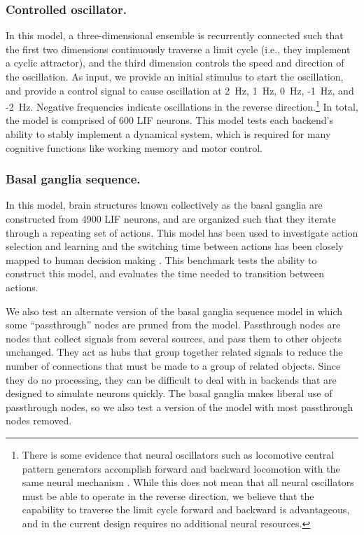 \documentclass{frontiersSCNS}
\begin{document}
\subsubsection{Controlled oscillator.}

In this model,
a three-dimensional ensemble is recurrently connected
such that the first two dimensions continuously
traverse a limit cycle
(i.e., they implement a cyclic attractor),
and the third dimension controls the speed
and direction of the oscillation.
As input, we provide an initial stimulus
to start the oscillation,
and provide a control signal
to cause oscillation at
2~Hz, 1~Hz, 0~Hz, -1~Hz, and -2~Hz.
Negative frequencies indicate oscillations
in the reverse direction.\footnote{There is some evidence
  that neural oscillators such as locomotive central pattern generators
  accomplish forward and backward locomotion
  with the same neural mechanism \citep{duysens1998}.
  While this does not mean that all neural oscillators must
  be able to operate in the reverse direction,
  we believe that the capability to traverse
  the limit cycle forward and backward is advantageous,
  and in the current design requires no additional neural resources.}
In total, the model is comprised of 600 LIF neurons.
This model tests each backend's ability
to stably implement a dynamical system,
which is required for many cognitive functions
like working memory and motor control.

\subsubsection{Basal ganglia sequence.}

In this model, brain structures
known collectively as the basal ganglia
are constructed from 4900 LIF neurons,
and are organized such that they iterate
through a repeating set of actions.
This model has been used to investigate
action selection and learning \citep{stewart2012a}
and the switching time between actions
has been closely mapped to human decision making
\citep{stewart2010}.
This benchmark tests the ability
to construct this model,
and evaluates the time needed
to transition between actions.

We also test an alternate version
of the basal ganglia sequence model
in which some ``passthrough'' nodes
are pruned from the model.
Passthrough nodes are nodes
that collect signals from several sources,
and pass them to other objects unchanged.
They act as hubs
that group together related signals
to reduce the number of connections
that must be made to
a group of related objects.
Since they do no processing,
they can be difficult to deal with
in backends that are designed to
simulate neurons quickly.
The basal ganglia makes liberal use
of passthrough nodes,
so we also test a version of the model
with most passthrough nodes removed.
\end{document}
